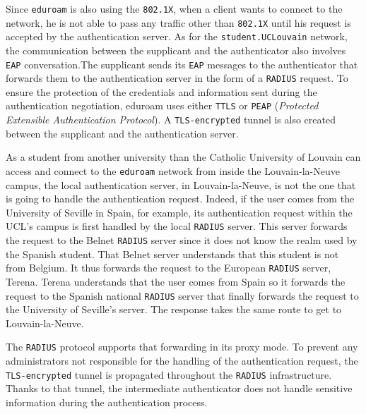 Since \texttt{eduroam} is also using the \texttt{802.1X}, when a client wants to connect to the network, he is not able to pass any traffic other than \texttt{802.1X} until his request is accepted by the authentication server. As for the \texttt{student.UCLouvain} network, the communication between the supplicant and the authenticator also involves \texttt{EAP} conversation.The supplicant sends its \texttt{EAP} messages to the authenticator that forwards them to the authentication server in the form of a \texttt{RADIUS} request. To ensure the protection of the credentials and information sent during the authentication negotiation, eduroam uses either \texttt{TTLS} or \texttt{PEAP} (\textit{Protected Extensible Authentication Protocol}). A \texttt{TLS-encrypted} tunnel is also created between the supplicant and the authentication server.

As a student from another university than the Catholic University of Louvain can access and connect to the \texttt{eduroam} network from inside the Louvain-la-Neuve campus, the local authentication server, in Louvain-la-Neuve, is not the one that is going to handle the authentication request. Indeed, if the user comes from the University of Seville in Spain, for example, its authentication request within the UCL's campus is first handled by the local \texttt{RADIUS} server. This server forwards the request to the Belnet \texttt{RADIUS} server since it does not know the realm used by the Spanish student. That Belnet server understands that this student is not from Belgium. It thus forwards the request to the European \texttt{RADIUS} server, Terena. Terena understands that the user comes from Spain so it forwards the request to the Spanish national \texttt{RADIUS} server that finally forwards the request to the University of Seville's server. The response takes the same route to get to Louvain-la-Neuve.

The \texttt{RADIUS} protocol supports that forwarding in its proxy mode. To prevent any administrators not responsible for the handling of the authentication request, the \texttt{TLS-encrypted} tunnel is propagated throughout the \texttt{RADIUS} infrastructure. Thanks to that tunnel, the intermediate authenticator does not handle sensitive information during the authentication process.

